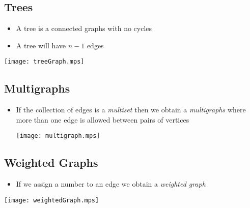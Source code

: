 
\begin{slide}
\section[-2]{Trees}

\begin{PauseHighLight}
  \begin{itemize}
  \item A tree is a connected graphs with no cycles\pause
  \item A tree will have $n-1$ edges\pause
  \end{itemize}
  \begin{center}\color{TextColor}
    \texttt{[image: treeGraph.mps]}
  \end{center}
\end{PauseHighLight}

\end{slide}



\begin{slide}
\section[-2]{Multigraphs}

\begin{PauseHighLight}
  \begin{itemize}
  \item If the collection of edges is a \textit{multiset} then we obtain
    a \emph{multigraphs} where more than one edge is allowed between
    pairs of vertices
  \begin{center}\color{TextColor}
    \texttt{[image: multigraph.mps]}\pause
  \end{center}
  \end{itemize}
\end{PauseHighLight}


\end{slide}



\begin{slide}
\section[-2]{Weighted Graphs}

\begin{PauseHighLight}
  \begin{itemize}
  \item If we assign a number to an edge we obtain a \emph{weighted
      graph}
  \end{itemize}
  \begin{center}\color{TextColor}
    \texttt{[image: weightedGraph.mps]}\pause
  \end{center}
\end{PauseHighLight}

\end{slide}

